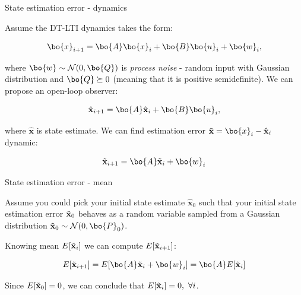 \documentclass{beamer}
\newcommand{\bhat}[1] {\hat{\mathbf{#1}}}
\newcommand{\btil}[1] {\Tilde{\mathbf{#1}}}
\begin{document}
\begin{frame}{State estimation error - dynamics}
	\begin{flushleft}
		
		Assume the DT-LTI dynamics takes the form:
		
		\begin{equation}
			\bo{x}_{i+1} = \bo{A} \bo{x}_i + \bo{B} \bo{u}_i + \bo{w}_i,
		\end{equation}
		
		where $\bo{w} \sim \mathcal{N} (0, \bo{Q})$ is \emph{process noise} - random input with Gaussian distribution and $\bo{Q} \succeq 0$ (meaning that it is positive semidefinite). We can propose an open-loop observer:
		
		\begin{equation}
			\bhat{x}_{i+1} = \bo{A} \bhat{x}_i + \bo{B} \bo{u}_i, 
		\end{equation}
		
		where $\bhat{x}$ is state estimate. We can find estimation error $\btil{x} = \bo{x}_i - \bhat{x}_i$ dynamic:
		
		\begin{equation}
			\btil{x}_{i+1} = \bo{A} \btil{x}_i + \bo{w}_i
		\end{equation}
		
	\end{flushleft}
\end{frame}



\begin{frame}{State estimation error - mean}
	\begin{flushleft}
		
		Assume you could pick your initial state estimate $\bhat{x}_0$ such that your initial state estimation error $\btil{x}_0$ behaves as a random variable sampled from a  Gaussian distribution $\btil{x}_0 \sim \mathcal{N} (0, \bo{P}_0)$.
		
		\bigskip
		
		Knowing mean $E[\btil{x}_i]$ we can compute $E[\btil{x}_{i+1}]$:
		
		\begin{equation}
			E[\btil{x}_{i+1}] = E[\bo{A} \btil{x}_i + \bo{w}_i] = 
			\bo{A} E[\btil{x}_i]
		\end{equation}		
	
		Since $E[\btil{x}_0] = 0$, we can conclude that $E[\btil{x}_i] = 0, \ \forall i$.
		
		
	\end{flushleft}
\end{frame}
\end{document}
